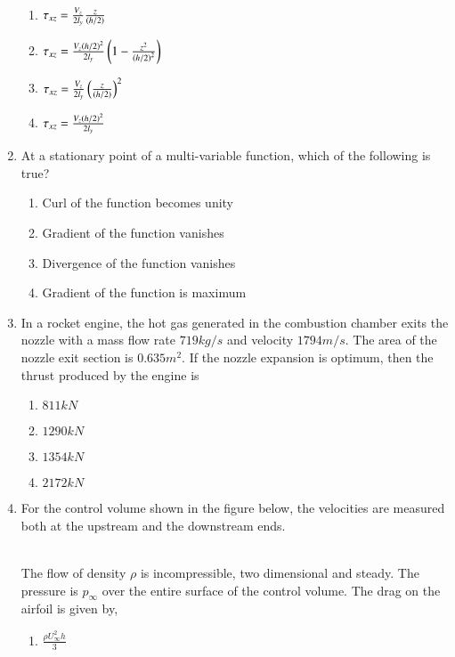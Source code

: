 \documentclass[journal]{IEEEtran}
\begin{document}
\begin{enumerate}
		\begin{figure}[!ht]
			
		\end{figure}
		\begin{enumerate}
			\item $\tau_{xz} = \frac{V_z}{2l_y}\frac{z}{\left(h/2\right)}$
			\item $\tau_{xz} = \frac{V_z\left(h/2\right)^2}{2l_y}\left(1-\frac{z^2}{\left(h/2\right)^2}\right)$
			\item $\tau_{xz} = \frac{V_z}{2l_y}\left(\frac{z}{\left(h/2\right)}\right)^2$
			\item $\tau_{xz} = \frac{V_z\left(h/2\right)^2}{2l_y}$
		\end{enumerate}
	\item At a stationary point of a multi-variable function, which of the following is true?
		\begin{enumerate}
			\item Curl of the function becomes unity
			\item Gradient of the function vanishes
			\item Divergence of the function vanishes
			\item Gradient of the function is maximum
		\end{enumerate}
	\item In a rocket engine, the hot gas generated in the combustion chamber exits the nozzle with a mass flow rate $719 kg/s$ and velocity $1794 m/s$. The area of the nozzle exit section is $0.635 m^2$. If the nozzle expansion is optimum, then the thrust produced by the engine is 
		\begin{enumerate}
			\item $811 kN$
			\item $1290 kN$
			\item $1354 kN$
			\item $2172 kN$
		\end{enumerate}
	\item For the control volume shown in the figure below, the velocities are measured both at the upstream and the downstream ends.
		\begin{figure}[h!]
			
		\end{figure}\\
		The flow of density $\rho$ is incompressible, two dimensional and steady. The pressure is $p_{\infty}$ over the entire surface of the control volume. The drag on the airfoil is given by,
		\begin{enumerate}
			\item $\frac{\rho U^2_{\infty}h}{3}$

\end{enumerate}
\end{enumerate}
\end{document}
